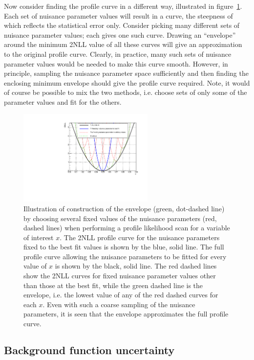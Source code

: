 Now consider finding the profile curve in a different way, illustrated
in figure~\ref{fig:concept:cartoon}.
Each set of nuisance
parameter values will result in a curve, the steepness of which reflects 
the statistical error only. Consider picking many different sets of nuisance
parameter values; each gives one such curve. Drawing an ``envelope'' around the
minimum 2NLL value of all these curves will give an approximation to the
original profile curve. Clearly, in practice, many such sets of nuisance
parameter values would be needed to make this curve smooth. However, in
principle, sampling the nuisance parameter space sufficiently
and then finding the enclosing
minimum envelope should give the profile curve required.
Note, it would of course be possible to mix the two methods, i.e.
choose sets of only some of the parameter values and fit for the others.
%
\begin{figure}[tbp]
\centering
\includegraphics[width=0.6\textwidth]{concept/envelope_cartoon.pdf}
\caption{Illustration of construction of the envelope (green, dot-dashed line)
by choosing several fixed values of the nuisance parameters (red, dashed lines)
when performing a profile likelihood scan for a variable of interest $x$.
The 2NLL profile curve for the nuisance parameters fixed to the best fit
values is shown by the blue, solid line. The full profile curve allowing the
nuisance parameters to be fitted for every value of $x$ is shown by the 
black, solid line. The red dashed lines show the 2NLL curves for fixed 
nuisance parameter values other than those at the best fit, while the green 
dashed line is the envelope, i.e. the lowest value of any of the red dashed 
curves for each $x$. Even with such a coarse sampling of the nuisance 
parameters, it is seen that the envelope approximates the full profile curve.}
\label{fig:concept:cartoon}
\end{figure}

\subsection{Background function uncertainty}
\label{sec:concept:functions}

